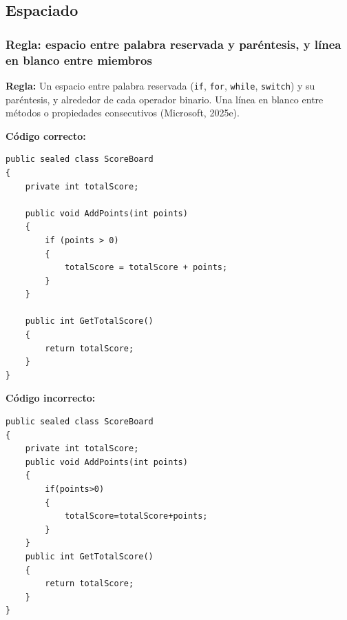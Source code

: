 \subsection{Espaciado}

\subsubsection{Regla: espacio entre palabra reservada y paréntesis, y línea en blanco entre miembros}

\textbf{Regla:} Un espacio entre palabra reservada (\texttt{if}, \texttt{for}, \texttt{while}, \texttt{switch}) y su paréntesis, y alrededor de cada operador binario. Una línea en blanco entre métodos o propiedades consecutivos (Microsoft, 2025e).

\textbf{Código correcto:}
\begin{lstlisting}[style=csharpstyle]
public sealed class ScoreBoard
{
    private int totalScore;

    public void AddPoints(int points)
    {
        if (points > 0)
        {
            totalScore = totalScore + points;
        }
    }

    public int GetTotalScore()
    {
        return totalScore;
    }
}
\end{lstlisting}

\textbf{Código incorrecto:}
\begin{lstlisting}[style=csharpstyle]
public sealed class ScoreBoard
{
    private int totalScore;
    public void AddPoints(int points)
    {
        if(points>0)
        {
            totalScore=totalScore+points;
        }
    }
    public int GetTotalScore()
    {
        return totalScore;
    }
}
\end{lstlisting}
